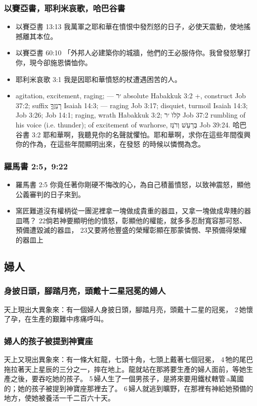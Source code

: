 \subsubsection{以賽亞書，耶利米哀歌，哈巴谷書}
\begin{itemize} 
\itemsep-.25em
\item 以賽亞書 13:13 我萬軍之耶和華在憤恨中發烈怒的日子，必使天震動，使地搖撼離其本位。
\item 以賽亞書 60:10 「外邦人必建築你的城牆，他們的王必服侍你。我曾發怒擊打你，現今卻施恩憐恤你。
\item 耶利米哀歌 3:1 我是因耶和華憤怒的杖遭遇困苦的人。
\item agitation, excitement, raging; — ׳ר absolute Habakkuk 3:2 +, construct Job 37:2; suffix רָנְזֶךָ֑ Isaiah 14:3; — raging Job 3:17; disquiet, turmoil Isaiah 14:3; Job 3:26; Job 14:1; raging, wrath Habakkuk 3:2; קֹלוֺ ׳ר Job 37:2 rumbling of his voice (i.e. thunder); of excitement of warhorse, בְּרַעַשׁ וְרֹגֶּז Job 39:24.
哈巴谷書 3:2 耶和華啊，我聽見你的名聲就懼怕。耶和華啊，求你在這些年間復興你的作為，在這些年間顯明出來，在發怒 的時候以憐憫為念。
\end{itemize}  

\subsubsection{羅馬書 2:5，9:22}
\begin{itemize} 
\itemsep-.25em
\item 羅馬書 2:5 你竟任著你剛硬不悔改的心，為自己積蓄憤怒，以致神震怒，顯他公義審判的日子來到。
\item 窯匠難道沒有權柄從一團泥裡拿一塊做成貴重的器皿，又拿一塊做成卑賤的器皿嗎？ 22倘若神要顯明他的憤怒，彰顯他的權能，就多多忍耐寬容那可怒、預備遭毀滅的器皿， 23又要將他豐盛的榮耀彰顯在那蒙憐憫、早預備得榮耀的器皿上
\end{itemize}  





\subsection{婦人}
\subsubsection{身披日頭，腳踏月亮，頭戴十二星冠冕的婦人}
天上現出大異象來：有一個婦人身披日頭，腳踏月亮，頭戴十二星的冠冕， 2 她懷了孕，在生產的艱難中疼痛呼叫。
\subsubsection{婦人的孩子被提到神寶座}
天上又現出異象來：有一條大紅龍，七頭十角，七頭上戴著七個冠冕， 4 牠的尾巴拖拉著天上星辰的三分之一，摔在地上。龍就站在那將要生產的婦人面前，等她生產之後，要吞吃她的孩子。 5 婦人生了一個男孩子，是將來要用鐵杖轄管 a萬國的；她的孩子被提到神寶座那裡去了。 6 婦人就逃到曠野，在那裡有神給她預備的地方，使她被養活一千二百六十天。

